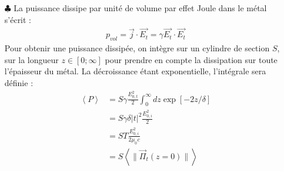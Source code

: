 \documentclass{report}
\begin{document}
\begin{itemize}
	\item[$\clubsuit$] La puissance dissipe par unité de volume par effet Joule dans le métal s'écrit :
	\begin{align*}
		p_{vol}=\vec{j}\cdot\vec{E_t}=\gamma\vec{E_t}\cdot\vec{E_t}
	\end{align*}
	Pour obtenir une puissance dissipée, on intègre sur un cylindre de section $S$, sur la longueur $z\in[0;\infty]$ pour prendre en compte la dissipation sur toute l'épaisseur du métal. La décroissance étant exponentielle, l'intégrale sera définie :
	\begin{align*}
		\left\langle P \right\rangle &= S\gamma\frac{E_{0,t}^2}{2}\int_0^\infty dz\exp[-2z/\delta] \\
		&= S\gamma\delta|t|^2\frac{E_{0,i}^2}{2} \\
		&= ST\frac{E_{0,i}^2}{2\mu_0 c} \\
		&=S\left\langle \parallel\vec{\Pi}_t(z=0)\parallel\right\rangle
	\end{align*}
	
\end{itemize}
\end{document}
